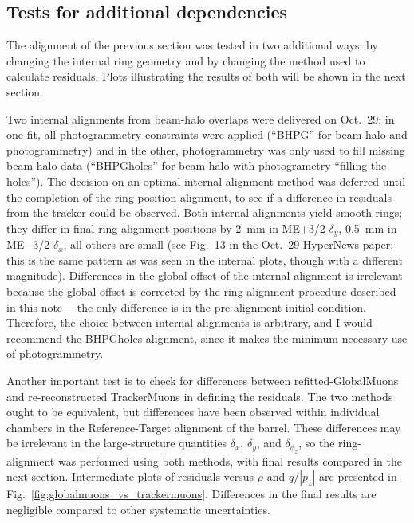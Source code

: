 \documentclass[12pt]{article}
\begin{document}
\subsection{Tests for additional dependencies}
\label{sec:additional_tests}

The alignment of the previous section was tested in two additional
ways: by changing the internal ring geometry and by changing the
method used to calculate residuals.  Plots illustrating the results of
both will be shown in the next section.

Two internal alignments from beam-halo overlaps were delivered on
Oct.~29; in one fit, all photogrammetry constraints were applied
(``BHPG'' for beam-halo and photogrammetry) and in the other,
photogrammetry was only used to fill missing beam-halo data
(``BHPGholes'' for beam-halo with photogrametry ``filling the
holes'').  The decision on an optimal internal alignment method was
deferred until the completion of the ring-position alignment, to see
if a difference in residuals from the tracker could be observed.  Both
internal alignments yield smooth rings; they differ in final ring
alignment positions by 2~mm in ME$+$3/2 $\delta_y$, 0.5~mm in ME$-$3/2
$\delta_x$, all others are small (see Fig.~13 in the Oct.~29 HyperNews
paper; this is the same pattern as was seen in the internal plots,
though with a different magnitude).  Differences in the global offset
of the internal alignment is irrelevant because the global offset is
corrected by the ring-alignment procedure described in this note---
the only difference is in the pre-alignment initial condition.
Therefore, the choice between internal alignments is arbitrary, and I
would recommend the BHPGholes alignment, since it makes the
minimum-necessary use of photogrammetry.

Another important test is to check for differences between
refitted-GlobalMuons and re-reconstructed TrackerMuons in defining the
residuals.  The two methods ought to be equivalent, but differences
have been observed within individual chambers in the Reference-Target
alignment of the barrel.  These differences may be irrelevant in the
large-structure quantities $\delta_x$, $\delta_y$, and
$\delta_{\phi_z}$, so the ring-alignment was performed using both
methods, with final results compared in the next section.
Intermediate plots of residuals versus $\rho$ and $q/|p_z|$ are
presented in Fig.~\ref{fig:globalmuons_vs_trackermuons}.  Differences
in the final results are negligible compared to other systematic
uncertainties.
\end{document}
